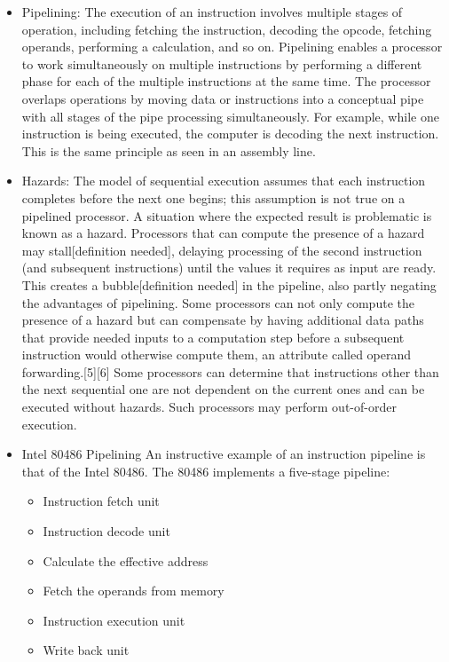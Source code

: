\begin{itemize}
\item Pipelining: The execution of an instruction involves multiple stages of operation,
including fetching the instruction, decoding the opcode, fetching operands,
performing a calculation, and so on. Pipelining enables a processor to
work simultaneously on multiple instructions by performing a different phase
for each of the multiple instructions at the same time. The processor overlaps
operations by moving data or instructions into a conceptual pipe with all
stages of the pipe processing simultaneously. For example, while one instruction
is being executed, the computer is decoding the next instruction. This is
the same principle as seen in an assembly line.
\item Hazards:
The model of sequential execution assumes that each instruction completes before the next one begins; this assumption is not true on a pipelined processor. A situation where the expected result is problematic is known as a hazard. Processors that can compute the presence of a hazard may stall[definition needed], delaying processing of the second instruction (and subsequent instructions) until the values it requires as input are ready. This creates a bubble[definition needed] in the pipeline, also partly negating the advantages of pipelining.
Some processors can not only compute the presence of a hazard but can compensate by having additional data paths that provide needed inputs to a computation step before a subsequent instruction would otherwise compute them, an attribute called operand forwarding.[5][6]
Some processors can determine that instructions other than the next sequential one are not dependent on the current ones and can be executed without hazards. Such processors may perform out-of-order execution.
\item Intel 80486 Pipelining
An instructive example of an instruction pipeline is that of the Intel 80486. The
80486 implements a five-stage pipeline:
	\begin{itemize}
	\item Instruction fetch unit
	\item Instruction decode unit
	\item Calculate the effective address
	\item Fetch the operands from memory
	\item Instruction execution unit
	\item Write back unit
	\end{itemize}
\end{itemize}

